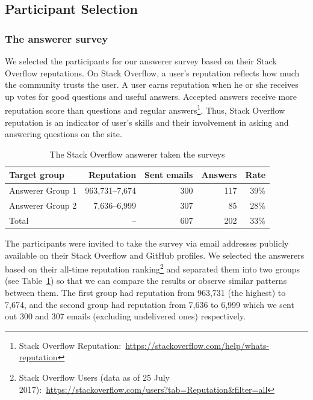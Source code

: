 \documentclass{svjour3}                     %
\begin{document}
\subsection{Participant Selection}

\subsubsection{The answerer survey} 
We selected the participants for our answerer survey based on their Stack
Overflow reputations. On Stack Overflow, a user's reputation reflects how much
the community trusts the user. A user earns reputation when he or she receives
up votes for good questions and useful answers. Accepted answers receive more
reputation score than questions and regular answers\footnote{Stack Overflow
	Reputation:~\url{https://stackoverflow.com/help/whats-reputation}}. Thus, Stack
Overflow reputation is an indicator of user's skills and their involvement in
asking and answering questions on the site.

\begin{table}
	\centering
	\caption{The Stack Overflow answerer taken the surveys}
	\label{tab:answerers}
	\begin{tabular}{lrrrr}
		\toprule
		Target group & Reputation & Sent emails & Answers & Rate \\
		\midrule
		Answerer Group 1 & 963,731--7,674 & 300 & 117 & 39\% \\
		Answerer Group 2 & 7,636--6,999 & 307 & 85 & 28\% \\
		\midrule
		Total & -- & 607 & 202 & 33\% \\
		\bottomrule
	\end{tabular}
\end{table}

The participants were invited to take the survey via email addresses publicly
available on their Stack Overflow and GitHub profiles. We selected the answerers
based on their all-time reputation ranking\footnote{Stack Overflow Users (data as of
	25 July 2017):~\url{https://stackoverflow.com/users?tab=Reputation&filter=all}}
and separated them into two groups (see Table~\ref{tab:answerers}) so that we
can compare the results or observe similar patterns between them. The first
group had reputation from 963,731 (the highest) to 7,674, and the second group
had reputation from 7,636 to 6,999 which we sent out 300 and 307 emails
(excluding undelivered ones) respectively. 
\end{document}
